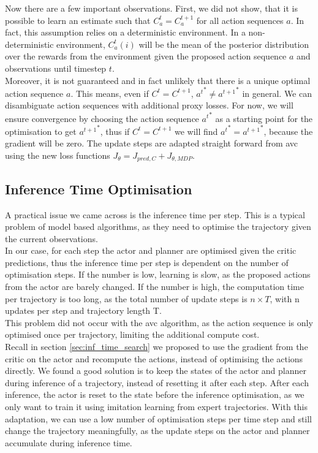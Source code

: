 Now there are a few important observations. First, we did not show, that it is possible to learn an estimate such that $C_a^t = C_a^{t+1}$ for all action sequences $a$. 
In fact, this assumption relies on a deterministic 
environment. In a non-deterministic environment, $C_a^t(i)$ will be the mean of the posterior distribution over the rewards from the environment given the proposed action sequence $a$ 
and observations until timestep $t$. \\

Moreover, it is not guaranteed and in fact unlikely that there is a unique optimal action sequence $a$. This means, even if $C^t = C^{t+1}$, ${a^t}^* \neq {a^{t+1}}^*$ in general. We can 
disambiguate action sequences with additional proxy losses. 
For now, we will ensure convergence by choosing the action sequence ${a^t}^*$ as a starting point for the optimisation to get ${a^{t+1}}^*$, thus if $C^t = C^{t+1}$ we will find 
${a^t}^* = {a^{t+1}}^*$, because the gradient will be zero. 
The update 
steps are adapted straight forward from \ac{avc} using the new loss functions $J_{\theta} = J_{pred, C} + J_{\theta, MDP}$. 

\subsection{Inference Time Optimisation}
A practical issue we came across is the inference time per step. This is a typical problem of model based algorithms, as they need to optimise the trajectory given 
the current observations.\\ 

In our case, for each step the actor and planner are optimised given the critic predictions, thus the inference time 
per step is dependent on the number of optimisation steps. If the number is low, learning is slow, as the proposed actions from the actor are barely changed. 
If the number is high, the computation time per trajectory is too long, as the total number of update steps is $n \times T$, with n updates per step and trajectory length 
T.\\ 

This problem did not occur with the \ac{avc} algorithm, as the action sequence is only optimised 
once per trajectory, limiting the additional compute cost.\\

Recall in section \ref{sec:inf_time_search} we proposed to use the gradient from the critic on the actor and recompute the 
actions, instead of optimising the actions directly. We found a good solution is to keep the states of the actor and planner during inference of a trajectory, 
instead of resetting it after each step. After each inference, the actor is reset to the state before the inference optimisation, as we only want to 
train it using imitation learning from expert trajectories. With this adaptation, we can use a low number of optimisation steps per time step and still change the trajectory meaningfully, 
as the update steps on the actor and planner accumulate during inference time.
     
